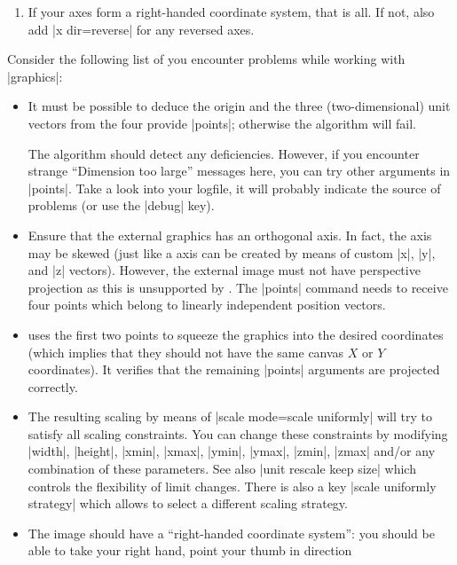 {{\begin{enumerate}
        In Matlab, this can be simplified by the tool mentioned on
        page~\pageref{sec:plotgraphics3d:matlabscript}.
    \item If your axes form a right-handed coordinate system, that is all. If
        not, also add |x dir=reverse| for any reversed axes.
\end{enumerate}

\noindent Consider the following list of you encounter problems while working
with  |graphics|:
%
\begin{itemize}
    \item It must be possible to deduce the origin and the three
        (two-dimensional) unit vectors from the four provide |points|;
        otherwise the algorithm will fail.

        The algorithm should detect any deficiencies. However, if you
        encounter strange ``Dimension too large'' messages here, you can try
        other arguments in |points|. Take a look into your logfile, it will
        probably indicate the source of problems (or use the |debug| key).
    \item Ensure that the external graphics has an orthogonal axis. In fact,
        the axis may be skewed (just like a \PGFPlots{} axis can be created
        by means of custom |x|, |y|, and |z| vectors). However, the external
        image must not have perspective projection as this is unsupported by
        \PGFPlots{}. The |points| command needs to receive four points which
        belong to linearly independent position vectors.
    \item \PGFPlots{} uses the first two points to squeeze the graphics into
        the desired coordinates (which implies that they should not have the
        same canvas $X$ or $Y$ coordinates). It verifies that the remaining
        |points| arguments are projected correctly.
    \item The resulting scaling by means of |scale mode=scale uniformly| will
        try to satisfy all scaling constraints. You can change these
        constraints by modifying |width|, |height|, |xmin|, |xmax|, |ymin|,
        |ymax|, |zmin|, |zmax| and/or any combination of these parameters.
        See also |unit rescale keep size| which controls the flexibility of
        limit changes. There is also a key |scale uniformly strategy| which
        allows to select a different scaling strategy.
    \item The image should have a ``right-handed coordinate system'': you
        should be able to take your right hand, point your thumb in direction

\end{itemize}}}
